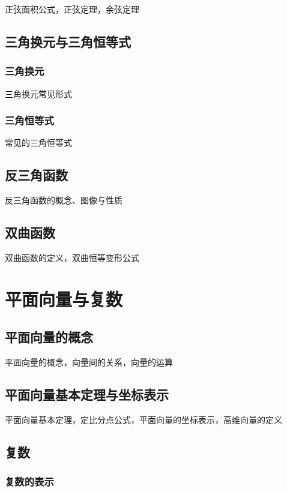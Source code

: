 \documentclass[lang=cn, zihao=4.5]{elegantbook}
\begin{document}
正弦面积公式，正弦定理，余弦定理

\section{三角换元与三角恒等式}

\subsection{三角换元}

三角换元常见形式

\subsection{三角恒等式}

常见的三角恒等式

\section{反三角函数}

反三角函数的概念、图像与性质

\section{双曲函数}

双曲函数的定义，双曲恒等变形公式

\chapter{平面向量与复数}

\section{平面向量的概念}

平面向量的概念，向量间的关系，向量的运算

\section{平面向量基本定理与坐标表示}

平面向量基本定理，定比分点公式，平面向量的坐标表示，高维向量的定义

\section{复数}

\subsection{复数的表示}
\end{document}
